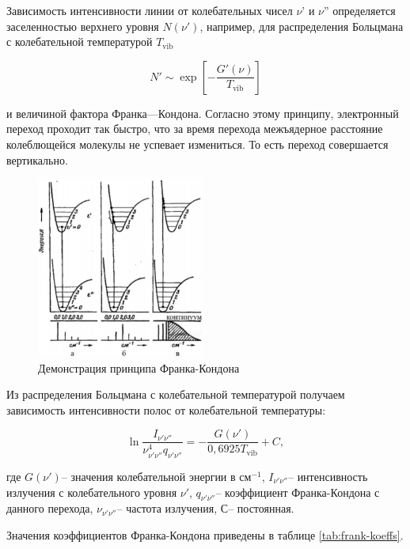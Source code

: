 Зависимость интенсивности линии от колебательных чисел $\nu$' и $\nu$'' определяется заселенностью верхнего уровня $N(\nu')$, например, для распределения Больцмана с колебательной температурой $T_\text{vib}$

\begin{equation}
N' \sim \exp \left[ -\frac{G'(\nu)}{T_\text{vib}} \right]
\end{equation}

и величиной фактора Франка—Кондона. Согласно этому принципу, электронный переход проходит так быстро, что за время перехода межъядерное расстояние колеблющейся молекулы не успевает измениться. То есть переход совершается вертикально.

\begin{figure}[H]
	\begin{center}
		\includegraphics[width=0.49\textwidth]{fk.png}
		\caption{Демонстрация принципа Франка-Кондона}
	\end{center}	
\end{figure}

Из распределения Больцмана с колебательной температурой получаем зависимость интенсивности полос от колебательной температуры: 

\begin{equation}
\ln{\frac{I_{\nu' \nu ''}}{{\nu}_{\nu' \nu''}^4 q_{\nu' \nu''}}} = - \frac{G(\nu')}{0,6925T_\text{vib}} + C,
\label{eq:main_rot}
\end{equation}

где $G(\nu')$-- значения колебательной энергии в $\text{см}^{-1}$, $I_{\nu' \nu ''}$-- интенсивность излучения с колебательного уровня $\nu'$, $q_{\nu' \nu''}$-- коэффициент Франка-Кондона с данного перехода, ${\nu}_{\nu' \nu''}$-- частота излучения, С-- постоянная.

Значения коэффициентов Франка-Кондона приведены в таблице \ref{tab:frank-koeffs}.

